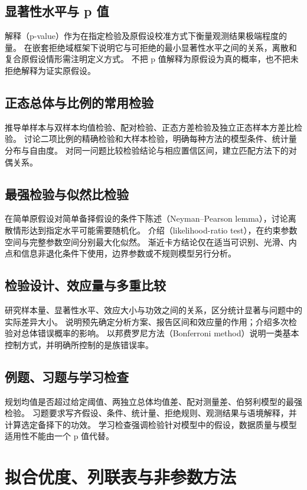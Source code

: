 \documentclass[UTF8,12pt,a4paper,fontset=fandol]{ctexbook}
\begin{document}
\section{显著性水平与 p 值}
\label{sec:ps-p-values}
解释（p-value）作为在指定检验及原假设校准方式下衡量观测结果极端程度的量。
在嵌套拒绝域框架下说明它与可拒绝的最小显著性水平之间的关系，离散和复合原假设情形需注明定义方式。
不把 p 值解释为原假设为真的概率，也不把未拒绝解释为证实原假设。

\section{正态总体与比例的常用检验}
\label{sec:ps-classical-tests}
推导单样本与双样本均值检验、配对检验、正态方差检验及独立正态样本方差比检验。
讨论二项比例的精确检验和大样本检验，明确每种方法的模型条件、统计量分布与自由度。
对同一问题比较检验结论与相应置信区间，建立匹配方法下的对偶关系。

\section{最强检验与似然比检验}
\label{sec:ps-likelihood-ratio-tests}
在简单原假设对简单备择假设的条件下陈述（Neyman--Pearson lemma），讨论离散情形达到指定水平可能需要随机化。
介绍（likelihood-ratio test），在约束参数空间与完整参数空间分别最大化似然。
渐近卡方结论仅在适当可识别、光滑、内点和信息非退化条件下使用，边界参数或不规则模型另行分析。

\section{检验设计、效应量与多重比较}
\label{sec:ps-power-multiplicity}
研究样本量、显著性水平、效应大小与功效之间的关系，区分统计显著与问题中的实际差异大小。
说明预先确定分析方案、报告区间和效应量的作用；介绍多次检验对总体错误概率的影响。
以邦费罗尼方法（Bonferroni method）说明一类基本控制方式，并明确所控制的是族错误率。

\section{例题、习题与学习检查}
规划均值是否超过给定阈值、两独立总体均值差、配对测量差、伯努利模型的最强检验。
习题要求写齐假设、条件、统计量、拒绝规则、观测结果与语境解释，并计算选定备择下的功效。
学习检查强调检验针对模型中的假设，数据质量与模型适用性不能由一个 p 值代替。


\chapter{拟合优度、列联表与非参数方法}
\label{chap:ps-nonparametric}
\end{document}
